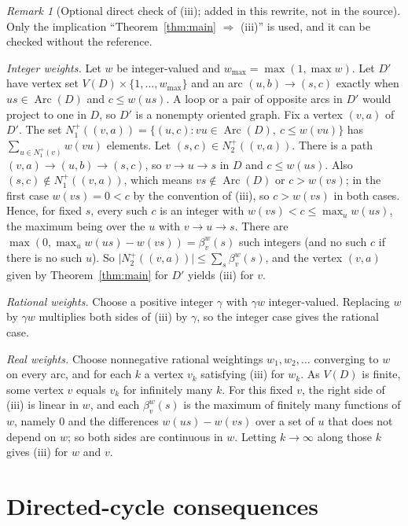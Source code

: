 \documentclass[11pt]{article}
\theoremstyle{remark}
\newtheorem{remark}[theorem]{Remark}
\newcommand{\abs}[1]{\lvert #1\rvert}
\DeclareMathOperator{\Arc}{Arc}
\begin{document}
\begin{remark}[Optional direct check of \textup{(iii)}; added in this rewrite, not in the source]
\label{rem:arc-check}
Only the implication ``Theorem~\ref{thm:main} $\Rightarrow$ \textup{(iii)}''
is used, and it can be checked without the reference.

\emph{Integer weights.} Let $w$ be integer-valued and
$w_{\max}=\max(1,\max w)$. Let $D'$ have vertex set
$V(D)\times\{1,\dots,w_{\max}\}$ and an arc $(u,b)\to(s,c)$ exactly when
$us\in\Arc(D)$ and $c\le w(us)$. A loop or a pair of opposite arcs in $D'$
would project to one in $D$, so $D'$ is a nonempty oriented graph. Fix a
vertex $(v,a)$ of $D'$. The set
$N_1^+((v,a))=\{(u,c):vu\in\Arc(D),\ c\le w(vu)\}$ has
$\sum_{u\in N_1^+(v)}w(vu)$ elements. Let $(s,c)\in N_2^+((v,a))$. There is
a path $(v,a)\to(u,b)\to(s,c)$, so $v\to u\to s$ in $D$ and $c\le w(us)$.
Also $(s,c)\notin N_1^+((v,a))$, which means $vs\notin\Arc(D)$ or
$c>w(vs)$; in the first case $w(vs)=0<c$ by the convention of
\textup{(iii)}, so $c>w(vs)$ in both cases. Hence, for fixed $s$, every such
$c$ is an integer with $w(vs)<c\le\max_u w(us)$, the maximum being over the
$u$ with $v\to u\to s$. There are $\max(0,\max_u w(us)-w(vs))=\beta_v^w(s)$
such integers (and no such $c$ if there is no such $u$). So
$\abs{N_2^+((v,a))}\le\sum_s\beta_v^w(s)$, and the vertex $(v,a)$ given by
Theorem~\ref{thm:main} for $D'$ yields \textup{(iii)} for $v$.

\emph{Rational weights.} Choose a positive integer $\gamma$ with $\gamma w$
integer-valued. Replacing $w$ by $\gamma w$ multiplies both sides of
\textup{(iii)} by $\gamma$, so the integer case gives the rational case.

\emph{Real weights.} Choose nonnegative rational weightings $w_1,w_2,\dots$
converging to $w$ on every arc, and for each $k$ a vertex $v_k$ satisfying
\textup{(iii)} for $w_k$. As $V(D)$ is finite, some vertex $v$ equals $v_k$
for infinitely many $k$. For this fixed $v$, the right side of
\textup{(iii)} is linear in $w$, and each $\beta_v^w(s)$ is the maximum of
finitely many functions of $w$, namely $0$ and the differences
$w(us)-w(vs)$ over a set of $u$ that does not depend on $w$; so both sides
are continuous in $w$. Letting $k\to\infty$ along those $k$ gives
\textup{(iii)} for $w$ and $v$.
\end{remark}

\section{Directed-cycle consequences}\label{sec:directed-cycle-consequences}
\end{document}
